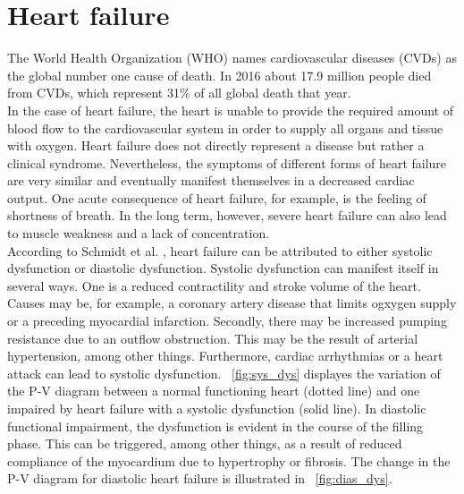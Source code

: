 \section{Heart failure}
The World Health Organization (WHO) names cardiovascular diseases (CVDs) as the global number one cause of death. In 2016 about 17.9 million people died from CVDs, which represent 31{\%} of all global death that year. \cite{WHO}
\\In the case of heart failure, the heart is unable to provide the required amount of blood flow to the cardiovascular system in order to supply all organs and tissue with oxygen.
Heart failure does not directly represent a disease but rather a clinical syndrome. Nevertheless, the symptoms of different forms of heart failure are very similar and eventually manifest themselves in a decreased cardiac output. One acute consequence of heart failure, for example, is the feeling of shortness of breath. In the long term, however, severe heart failure can also lead to muscle weakness and a lack of concentration.
\\According to Schmidt et al. \cite{HKS4}, heart failure can be attributed to either systolic dysfunction or diastolic dysfunction. Systolic dysfunction can manifest itself in several ways. One is a reduced contractility and stroke volume of the heart. Causes may be, for example, a coronary artery disease that limits ogxygen supply or a preceding myocardial infarction. Secondly, there may be increased pumping resistance due to an outflow obstruction.  This may be the result of arterial hypertension, among other things. Furthermore, cardiac arrhythmias or a heart attack can lead to systolic dysfunction. \figurename~\ref{fig:sys_dys} displayes the variation of the P-V diagram between a normal functioning heart (dotted line) and one impaired by heart failure with a systolic dysfunction (solid line). In diastolic functional impairment, the dysfunction is evident in the course of the filling phase. This can be triggered, among other things, as a result of reduced compliance of the myocardium due to hypertrophy or fibrosis. The change in the P-V diagram for diastolic heart failure is illustrated in \figurename~\ref{fig:dias_dys}.
